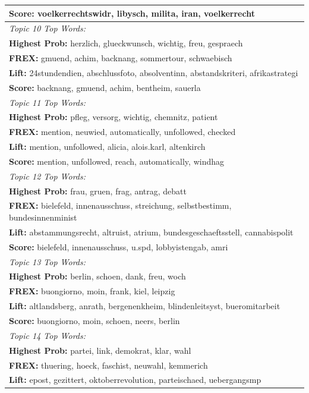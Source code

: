 \begin{center}
\begin{longtable}{|l|}
 	 \textbf{Score:} voelkerrechtswidr, libysch, milita, iran, voelkerrecht \\
\hline
\textit{Topic 10 Top Words:}\\
 	 \textbf{Highest Prob:} herzlich, glueckwunsch, wichtig, freu, gespraech \\
 	 \textbf{FREX:} gmuend, achim, backnang, sommertour, schwaebisch \\
 	 \textbf{Lift:} 24stundendien, abschlussfoto, absolventinn, abstandskriteri, afrikastrategi \\
 	 \textbf{Score:} backnang, gmuend, achim, bentheim, sauerla \\
\hline
\textit{Topic 11 Top Words:}\\
 	 \textbf{Highest Prob:} pfleg, versorg, wichtig, chemnitz, patient \\
 	 \textbf{FREX:} mention, neuwied, automatically, unfollowed, checked \\
 	 \textbf{Lift:} mention, unfollowed, alicia, alois.karl, altenkirch \\
 	 \textbf{Score:} mention, unfollowed, reach, automatically, windhag \\
\hline
\textit{Topic 12 Top Words:}\\
 	 \textbf{Highest Prob:} frau, gruen, frag, antrag, debatt \\
 	 \textbf{FREX:} bielefeld, innenausschuss, streichung, selbstbestimm, bundesinnenminist \\
 	 \textbf{Lift:} abstammungsrecht, altruist, atrium, bundesgeschaeftsstell, cannabispolit \\
 	 \textbf{Score:} bielefeld, innenausschuss, u.spd, lobbyistengab, amri \\
\hline
\textit{Topic 13 Top Words:}\\
 	 \textbf{Highest Prob:} berlin, schoen, dank, freu, woch \\
 	 \textbf{FREX:} buongiorno, moin, frank, kiel, leipzig \\
 	 \textbf{Lift:} altlandsberg, anrath, bergenenkheim, blindenleitsyst, bueromitarbeit \\
 	 \textbf{Score:} buongiorno, moin, schoen, neers, berlin \\
\hline
\textit{Topic 14 Top Words:}\\
 	 \textbf{Highest Prob:} partei, link, demokrat, klar, wahl \\
 	 \textbf{FREX:} thuering, hoeck, faschist, neuwahl, kemmerich \\
 	 \textbf{Lift:} epost, gezittert, oktoberrevolution, parteischaed, uebergangsmp \\

\end{longtable}
\end{center}
